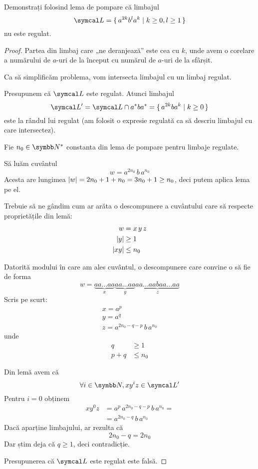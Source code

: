 \begin{exercise}
    Demonstrați folosind lema de pompare că limbajul
    \[\limbaj = \set{ a^{2k} b^l a^{k} | k \geq 0, l \geq 1 }\]
    nu este regulat.
\end{exercise}
\begin{proof}
    Partea din limbaj care „ne deranjează” este cea cu \(k\), unde avem o corelare a numărului de \(a\)-uri de la început cu numărul de \(a\)-uri de la sfârșit.

    Ca să simplificăm problema, vom intersecta limbajul cu un limbaj regulat.

    Presupunem că \(\limbaj\) este regulat. Atunci limbajul
    \[\limbaj' = \limbaj \cap a^* b a^* = \set{ a^{2k} b a^k | k \geq 0 }\]
    este la rândul lui regulat (am folosit o expresie regulată ca să descriu limbajul cu care intersectez).

    Fie \(n_0 \in \naturals^*\) constanta din lema de pompare pentru limbaje regulate.

    Să luăm cuvântul
    \[w = a^{2 n_0} \, b \, a^{n_0}\]
    Acesta are lungimea \(\left\lvert w\right\rvert = 2 n_0 + 1 + n_0 = 3n_0 + 1 \geq n_0\), deci putem aplica lema pe el.

    Trebuie să ne gândim cum ar arăta o descompunere a cuvântului care să respecte proprietățile din lemă:
    \begin{align*}
        w        & = x \, y \, z \\
        \left\lvert y\right\rvert  & \geq 1        \\
        \left\lvert xy\right\rvert & \leq n_0
    \end{align*}

    Datorită modului în care am ales cuvântul, o descompunere care convine o să fie de forma
    \[
        w = \underbrace{aa \dots aa}_{x}
        \underbrace{aa \dots aa}_{y}
        \underbrace{aa \dots aa b aa \dots aa}_{z}
    \]
    Scris pe scurt:
    \begin{gather*}
        x = a^p \\
        y = a^q \\
        z = a^{2 n_0 - q - p} \, b \, a^{n_0}
    \end{gather*}
    unde
    \begin{align*}
        q     & \geq 1   \\
        p + q & \leq n_0
    \end{align*}

    Din lemă avem că
    \[\forall i \in \naturals, x y^i z \in \limbaj'\]
    Pentru \(i = 0\) obținem
    \begin{align*}
        x y^0 z & = a^p \, a^{2 n_0 - q - p} \, b \, a^{n_0} = \\
                & = a^{2 n_0 - q} \, b \, a^{n_0}
    \end{align*}
    Dacă aparține limbajului, ar rezulta că
    \[2 n_0 - q = 2 n_0\]
    Dar știm deja că \(q \geq 1\), deci contradicție.

    Presupunerea că \(\limbaj\) este regulat este falsă.
\end{proof}


